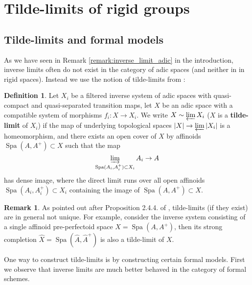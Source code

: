 \documentclass[10pt,oneside]{amsart}
\theoremstyle{definition}
\newtheorem{definition}[theorem]{Definition}
\newtheorem{remark}[theorem]{Remark}
\begin{document}
	
	\section{Tilde-limits of rigid groups} \label{section:tilde_limit}
  
	

		\subsection{Tilde-limits and formal models} 
		
	As we have seen in Remark \ref{remark:inverse_limit_adic} in the introduction, inverse limits often do not exist in the category of adic spaces (and neither in in rigid spaces). Instead we use the notion of tilde-limits from \cite{SW}:
	
	\begin{definition} 
Let $X_i$ be a filtered inverse system of adic spaces with quasi-compact and quasi-separated transition maps, let $X$ be an adic space with a compatible system of morphisms $f_i: X \rightarrow X_i$. We write $X \sim \varprojlim X_i$ ($X$ is a \textbf{tilde-limit} of $X_i$) if the map of underlying topological spaces $|X| \rightarrow \varprojlim |X_i|$ is a homeomorphism, and there exists an open cover of $X$ by affinoids $\operatorname{Spa} (A, A^+) \subset X$ such that the map 
$$ \varinjlim_{\operatorname{Spa}(A_i, A_i^+) \subset X_i} A_i \rightarrow A$$
has dense image, where the direct limit runs over all open affinoids $\operatorname{Spa}(A_i, A_i^+) \subset X_i$ containing the image of $\operatorname{Spa}(A, A^+) \subset X$.
	\end{definition}
	
	\begin{remark} \label{remark:tilde_limit_non_unique}
As pointed out after Proposition 2.4.4. of \cite{SW}, tilde-limits (if they exist) are in general not unique. For example, consider the inverse system consisting of a single affinoid pre-perfectoid space $X = \operatorname{Spa}(A, A^+)$, then its strong completion $\hat X = \operatorname{Spa}(\hat A,\hat A^+) $ is also a tilde-limit of $X$. 
	\end{remark}
	
One way to construct tilde-limits is by constructing certain formal models. First we observe that inverse limits are much better behaved in the category of formal schemes. 
\end{document}

